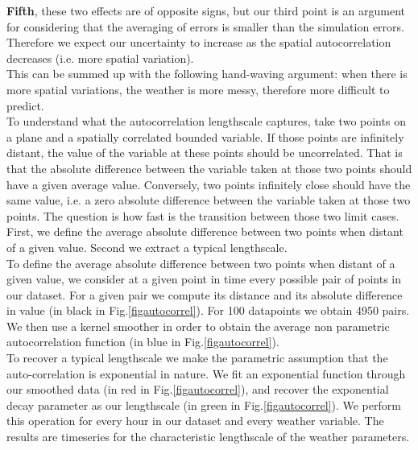 \textbf{Fifth}, these two effects are of opposite signs, but our third point is an argument for considering that the averaging of errors is smaller than the simulation errors. Therefore we expect our uncertainty to increase as the spatial autocorrelation decreases (i.e. more spatial variation). \\

This can be summed up with the following hand-waving argument: when there is more spatial variations, the weather is more messy, therefore more difficult to predict. \\

To understand what the autocorrelation lengthscale captures, take two points on a plane and a spatially correlated bounded variable. If those points are infinitely distant, the value of the variable at these points should be uncorrelated. That is that the absolute difference between the variable taken at those two points should have a given average value. Conversely, two points infinitely close should have the same value, i.e. a zero absolute difference between the variable taken at those two points. The question is how fast is the transition between those two limit cases. First, we define the average absolute difference between two points when distant of a given value. Second we extract a typical lengthscale. \\

To define the average absolute difference between two points when distant of a given value, we consider at a given point in time every possible pair of points in our dataset. For a given pair we compute its distance and its absolute difference in value (in black in Fig.\ref{figautocorrel}). For 100 datapoints we obtain 4950 pairs. We then use a kernel smoother in order to obtain the average non parametric autocorrelation function (in blue in Fig.\ref{figautocorrel}). \\

To recover a typical lengthscale we make the parametric assumption that the auto-correlation is exponential in nature. We fit an exponential function through our smoothed data (in red in Fig.\ref{figautocorrel}), and recover the exponential decay parameter as our lengthscale (in green in Fig.\ref{figautocorrel}). We perform this operation for every hour in our dataset and every weather variable. The results are timeseries for the characteristic lengthscale of the weather parameters.


